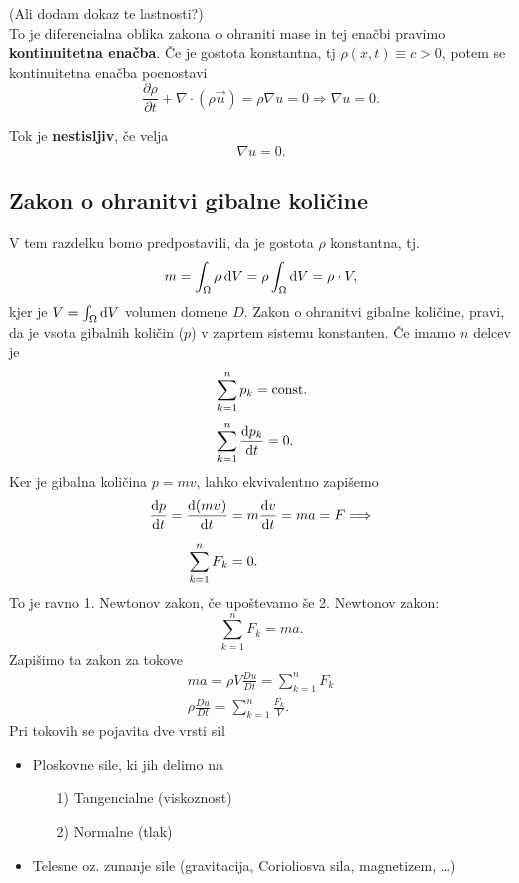 \documentclass[mat2, tisk]{fmfdelo}
\begin{document}
(Ali dodam dokaz te lastnosti?)\\
To je diferencialna oblika zakona o ohraniti mase in tej enačbi pravimo \textbf{kontinuitetna enačba}.
Če je gostota konstantna, tj $\rho(x, t) \equiv c > 0$, potem se kontinuitetna enačba poenostavi
$$
\frac{\partial \rho}{\partial t} + \nabla \cdot (\rho\vec{u}) = \rho \nabla u = 0 \Longrightarrow \nabla u = 0.
$$
\begin{definicija}
Tok je \textbf{nestisljiv}, če velja 
\begin{equation}
\label{ohranitev mase}
  \nabla u = 0.    
\end{equation}
\end{definicija}

\subsection{Zakon o ohranitvi gibalne količine}
V tem razdelku bomo predpostavili, da je gostota $\rho$ konstantna, tj.
\begin{equation}
m = \int_\Omega \rho \dif V = \rho \int_\Omega \dif V = \rho \cdot V,
\end{equation}
kjer je $V = \int_\Omega \dif V$ volumen domene $D$. Zakon o ohranitvi gibalne količine, 
pravi, da je vsota gibalnih količin ($p$) v zaprtem sistemu konstanten. Če imamo $n$ delcev je
\begin{align*}
&\sum_{k=1}^n p_k = \text{const.} \\[1mm]
&\sum_{k=1}^n \frac{\dif p_k}{\dif t} = 0.
\end{align*}
Ker je gibalna količina $p = m v$, lahko ekvivalentno zapišemo
\begin{align*}
\frac{\dif p}{\dif t} = \frac{\dif \,(m v)}{\dif t} &= m\frac{\dif v}{\dif t} = m a = F \Longrightarrow\\[2mm]
\sum_{k=1}^n F_k &= 0.
\end{align*}
To je ravno 1. Newtonov zakon, če upoštevamo še 2. Newtonov zakon:
\begin{equation}
\sum_{k=1}^n F_k = m a.
\end{equation}
Zapišimo ta zakon za tokove
\begin{align*}
m a = \rho V \frac{D u}{D t} = \sum_{k=1}^n F_k \\
\rho \frac{D u}{D t} = \sum_{k=1}^n \frac{F_k}{V}. 
\end{align*}
Pri tokovih se pojavita dve vrsti sil 
\begin{itemize}
  \item Ploskovne sile, ki jih delimo na 
  \begin{enumerate}
    \item[1)] Tangencialne (viskoznost)
    \item[2)] Normalne (tlak)
  \end{enumerate}
  \item Telesne oz. zunanje sile (gravitacija, Corioliosva sila, magnetizem, \dots)
\end{itemize}
\end{document}
